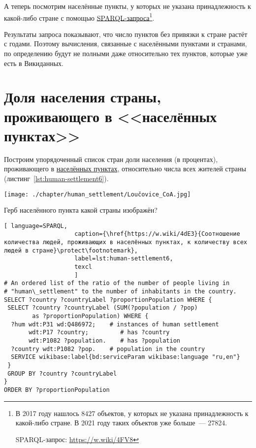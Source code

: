 А теперь посмотрим населённые пункты, 
у которых не указана принадлежность к какой-либо стране 
с помощью \href{https://w.wiki/4FV8}{SPARQL-запроса}\footnote{%
%
В 2017 году нашлось \num{8427} объектов, у которых не указана принадлежность к какой-либо стране. 
В 2021 году таких объектов уже больше~--- \num{27824}. 

SPARQL-запрос: \href{https://w.wiki/4FV8}{https://w.wiki/4FV8}%
}. 

Результаты запроса показывают, что число пунктов без привязки к стране растёт с годами. 
Поэтому вычисления, связанные с населёнными пунктами и странами, 
по определению будут не полными даже относительно тех пунктов, которые уже есть в Викиданных. 


\section{Доля населения страны, проживающего в <<населённых пунктах>>}

Построим упорядоченный список стран доли населения (в процентах), проживающего в \href{http://www.wikidata.org/entity/Q486972}{населённых пунктах}, относительно числа всех жителей страны (листинг~\ref{lst:human-settlement6}).
%
\begin{marginfigure}[0.0cm]
{\texttt{[image: ./chapter/human\_settlement/Loučovice\_CoA.jpg]}}
  \caption{Герб населённого пункта какой страны изображён?}%
  \label{fig:flag_question_human_settlements3}%
\end{marginfigure}

\begin{lstlisting}[ language=SPARQL, 
                    caption={\href{https://w.wiki/4dE3}{Соотношение количества людей, проживающих в населённых пунктах, к количеству всех людей в стране}\protect\footnotemark},
                    label=lst:human-settlement6,
                    texcl 
                    ]
# An ordered list of the ratio of the number of people living in 
# "human\_settlement" to the number of inhabitants in the country.
SELECT ?country ?countryLabel ?proportionPopulation WHERE {
 SELECT ?country ?countryLabel (SUM(?population / ?pop) 
        as ?proportionPopulation) WHERE {
  ?hum wdt:P31 wd:Q486972;    # instances of human settlement  
       wdt:P17 ?country;         # has ?country 
       wdt:P1082 ?population.    # has ?population
  ?country wdt:P1082 ?pop.    # population in the country
  SERVICE wikibase:label{bd:serviceParam wikibase:language "ru,en"}
 }
 GROUP BY ?country ?countryLabel
}
ORDER BY ?proportionPopulation
\end{lstlisting}%


